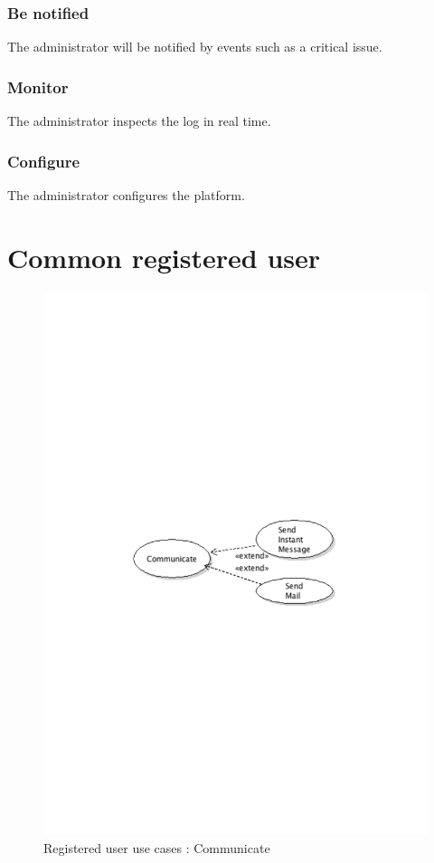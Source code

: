 		\subsubsection{Be notified}
			The administrator will be notified by events such as a critical issue.
		\subsubsection{Monitor}
			The administrator inspects the log in real time.
		\subsubsection{Configure}
			The administrator configures the platform.
\section{Common registered user}
	\begin{figure}[ht]
		\begin{center}
			\includegraphics[width=\textwidth,  trim=2cm 12cm 2cm 12cm]{UML_figure/UC/common/UC_Common_Communicate.pdf}
			\caption{Registered user use cases : Communicate}
		\end{center}
	\end{figure}
